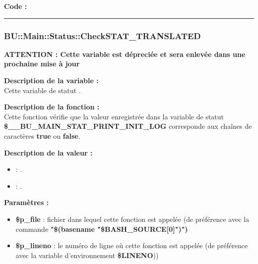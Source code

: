 \documentclass[a4paper,10pt]{article}
\begin{document}
\begin{justify}
    \textbf{Code :}
\end{justify}



\color{blue}\par\noindent\rule{\textwidth}{0.4pt}\color{white}

\color{blue}
\subsubsection{\color{mauve}BU::Main::Status::CheckSTAT\_TRANSLATED}\color{white}

\textbf{ATTENTION : Cette variable est dépreciée et sera enlevée dans une prochaine mise à jour}

\begin{justify}
    \textbf{Description de la variable :}\\
    Cette variable de statut .
\end{justify}

\begin{justify}
    \textbf{Description de la fonction :}\\
    Cette fonction vérifie que la valeur enregistrée dans la variable de statut \textbf{\color{orange}\$\_\_BU\_MAIN\_STAT\_PRINT\_INIT\_LOG} corresponde aux chaînes de caractères \textbf{true} ou \textbf{false}.
\end{justify}

\begin{justify}
    \textbf{Description de la valeur :}

    \begin{itemize}
        \item \textbf{} : .\\

        \item \textbf{} : .
    \end{itemize}

\end{justify}

\begin{justify}
    \textbf{Paramètres :}

    \begin{itemize}
        \item \color{orange}\textbf{\$p\_file}\color{white} : fichier dans lequel cette fonction est appelée (de préférence avec la commande \textbf{"\$(\color{gray}basename \color{white}"\color{orange}\$BASH\_SOURCE[0]\color{white}")")}\\

        \item \color{orange}\textbf{\$p\_lineno}\color{white} : le numéro de ligne où cette fonction est appelée (de préférence avec la variable d'environnement \textbf{\color{orange}\$LINENO}))
    \end{itemize}
\end{justify}
\end{document}
